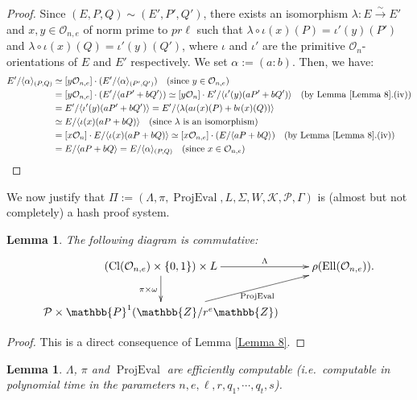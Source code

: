 \documentclass[a4paper,10pt,notitlepage]{report}
\theoremstyle{definition}
\theoremstyle{plain}
\newtheorem{Lemma}[Definition]{Lemma}
\theoremstyle{definition}
\newcommand{\ie}{\emph{i.e.}\ }
\newcommand{\Z}{\mathbb{Z}}
\newcommand{\m}[1]{\mathcal{#1}}
\newcommand{\mO}{\mathcal{O}}
\renewcommand{\(}{\left(}
\renewcommand{\)}{\right)}
\renewcommand{\P}{\mathbb{P}}
\DeclareMathOperator{\Cl}{Cl}
\DeclareMathOperator{\Ell}{Ell}
\DeclareMathOperator{\ProjEval}{ProjEval}
\begin{document}
\begin{proof}
Since $(E,P,Q)\sim (E',P',Q')$, there exists an isomorphism $\lambda:E\overset{\sim}{\longrightarrow} E'$ and $x, y\in\mO_{n,e}$ of norm prime to $pr\ell$ such that $\lambda\circ\iota(x)(P)=\iota'(y)(P')$ and $\lambda\circ\iota(x)(Q)=\iota'(y)(Q')$, where $\iota$ and $\iota'$ are the primitive $\mO_n$-orientations of $E$ and $E'$ respectively.  We set $\alpha:=(a:b)$. Then, we have:
\begin{align*}
E'/\langle\alpha\rangle_{(P,Q)}&\simeq [y\mO_{n,e}]\cdot(E'/\langle\alpha\rangle_{(P',Q')}) \quad (\mbox{since } y\in\mO_{n,e})\\
&=[y\mO_{n,e}]\cdot(E'/\langle aP'+bQ' \rangle)\simeq [y\mO_n]\cdot E'/\langle \iota'(y)(aP'+bQ')\rangle \quad (\mbox{by Lemma \ref{Lemma 8}.(iv)})\\
&= E'/\langle \iota'(y)(aP'+bQ')\rangle=E'/\langle \lambda(a\iota(x)(P)+b\iota(x)(Q))\rangle \\
&\simeq E/\langle \iota(x)(aP+bQ)\rangle\quad (\mbox{since } \lambda \mbox{ is an isomorphism})\\
&=[x\mO_n]\cdot E/\langle \iota(x)(aP+bQ)\rangle\simeq [x\mO_{n,e}]\cdot (E/\langle aP+bQ \rangle) \quad (\mbox{by Lemma \ref{Lemma 8}.(iv)})\\
&=E/\langle aP+bQ \rangle=E/\langle\alpha\rangle_{(P,Q)} \quad (\mbox{since } x\in\mO_{n,e})
\end{align*}
\end{proof}

We now justify that $\Pi:=(\Lambda,\pi,\ProjEval,L,\Sigma,W,\m{K},\m{P},\Gamma)$ is (almost but not completely) a hash proof system.

\begin{Lemma}
The following diagram is commutative:
\[\xymatrix{
(\Cl(\mO_{n,e})\times\{0,1\})\times L  \ar[r]^-{\Lambda} \ar[d]_{\pi\times\omega} & \rho(\Ell(\mO_{n,e})).\\
\m{P}\times \P^1(\Z/r^e\Z) \ar[ru]_{\ProjEval} &
}\]
\end{Lemma}

\begin{proof}
This is a direct consequence of Lemma \ref{Lemma 8}.
\end{proof}

\begin{Lemma}
$\Lambda$, $\pi$ and $\ProjEval$ are efficiently computable (\ie computable in polynomial time in the parameters $n, e,\ell, r, q_1, \cdots, q_t,s$).
\end{Lemma}
\end{document}
